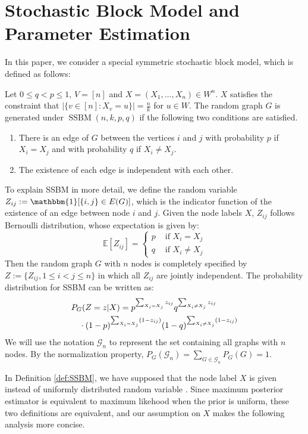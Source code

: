 \documentclass[entropy,article,submit,moreauthors,pdftex]{Definitions/mdpi}
\newcommand{\cG}{\mathcal{G}}
\newcommand{\1}{\mathbbm{1}}
\DeclareMathOperator{\SSBM}{SSBM}
\begin{document}
\section{Stochastic Block Model and Parameter Estimation}\label{sec:psbm}
In this paper, we consider a special symmetric stochastic block model, which is defined as follows:
	\begin{Definition} \label{def:SSBM}
	Let $0\leq q<p\leq 1$, $V=[n]$ and $X=(X_1,\dots,X_n)\in W^n$. $X$ satisfies the constraint that $|\{v \in [n] : X_v = u\}| = \frac{n}{k}$ for $u\in W$.
	The random graph $G$ is generated under $\SSBM(n,k,p,q)$ if the following two conditions are satisfied.
	\begin{enumerate}
	\item There is an edge of $G$ between the vertices $i$ and $j$ with probability $p$ if $X_i=X_j$ and with probability $q$ if $X_i \neq X_j$.
	\item The existence of each edge is independent with each other.
	\end{enumerate}
\end{Definition}
To explain SSBM in more detail,
we define the random variable $Z_{ij}:=\mathbbm{1}[\{i,j\} \in E(G)]$, which is the indicator function of the existence of an edge between node $i$ and $j$.
Given the node labels $X$, $Z_{ij}$ follows Bernoulli distribution, whose expectation is given by:
\begin{equation}
\mathbb{E}[Z_{ij}] =
\begin{cases}
p & \textrm{ if } X_i = X_j \\ 
q & \textrm{ if }  X_i \neq X_j
\end{cases}
\end{equation}
Then the random graph $G$ with $n$ nodes
is completely specified by $Z:=\{Z_{ij}, 1\leq i<j\leq n\}$ in which all $Z_{ij}$ are jointly independent.
The probability distribution for SSBM can be written as:
\begin{align}
&P_G(Z = z| X) = p^{\sum_{X_i = X_j} z_{ij}}q^{\sum_{X_i \neq X_j} z_{ij}} \notag \\
&\quad \cdot (1-p)^{\sum_{X_i = X_j} (1-z_{ij})}(1-q)^{\sum_{X_i \neq X_j} (1-z_{ij})} \label{eq:GmL}
\end{align}
We will use the notation $\cG_n$ to represent the set containing all graphs with $n$ nodes. By the normalization property,
$P_G(\cG_n) = \sum_{G\in \cG_n}P_G(G)=1$.

In Definition \ref{def:SSBM}, we have supposed that the node label $X$ is given instead of uniformly distributed random variable
. Since maximum posterior estimator is equivalent to maximum likehood when the prior is uniform,
these two definitions are equivalent, and our assumption on $X$ makes the following analysis more concise.
\end{document}
